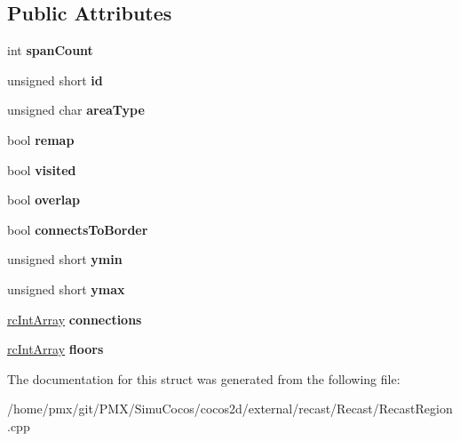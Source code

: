 \subsection*{Public Attributes}
\begin{DoxyCompactItemize}
\item 
\mbox{\label{structrcRegion_ad9093323ce31904ef59709b0664f31d3}} 
int {\bfseries span\+Count}
\item 
\mbox{\label{structrcRegion_a4938489b9fdddccbfb9273975632a30b}} 
unsigned short {\bfseries id}
\item 
\mbox{\label{structrcRegion_a35bfc8470602b06a1a09c519582b821a}} 
unsigned char {\bfseries area\+Type}
\item 
\mbox{\label{structrcRegion_afacd1efddbdfbb854e7c2cf505365f0b}} 
bool {\bfseries remap}
\item 
\mbox{\label{structrcRegion_a59b8c8837159f85c1b8f7818976d26ae}} 
bool {\bfseries visited}
\item 
\mbox{\label{structrcRegion_a74e8d6e0e6bd376822dfa732aa7106b3}} 
bool {\bfseries overlap}
\item 
\mbox{\label{structrcRegion_a4ddce7919ddb139fe21ac4c05b5c3f79}} 
bool {\bfseries connects\+To\+Border}
\item 
\mbox{\label{structrcRegion_a058cf62973ff65b0d277724ed7cde9a8}} 
unsigned short {\bfseries ymin}
\item 
\mbox{\label{structrcRegion_a84ec21b2fef6d82817283727f295f14e}} 
unsigned short {\bfseries ymax}
\item 
\mbox{\label{structrcRegion_ac6cbe80ad7da2858aa3f463079bc391e}} 
\hyperlink{classrcIntArray}{rc\+Int\+Array} {\bfseries connections}
\item 
\mbox{\label{structrcRegion_a3ab2d5343e1ae28463c5a8ccbca04cf1}} 
\hyperlink{classrcIntArray}{rc\+Int\+Array} {\bfseries floors}
\end{DoxyCompactItemize}


The documentation for this struct was generated from the following file\+:\begin{DoxyCompactItemize}
\item 
/home/pmx/git/\+P\+M\+X/\+Simu\+Cocos/cocos2d/external/recast/\+Recast/Recast\+Region.\+cpp\end{DoxyCompactItemize}
